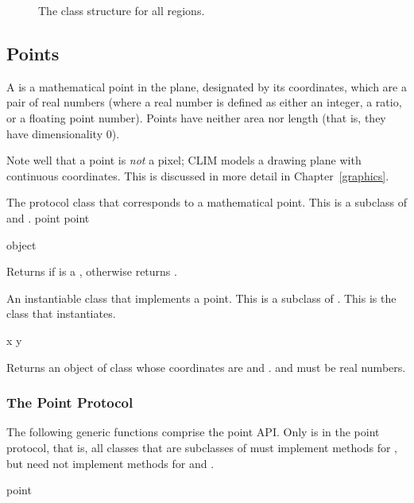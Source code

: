 \begin{figure}
\ifpsfig\centerline{}\else\vspace{2.0in}\fi
\caption{The class structure for all regions.}
\end{figure}


\subsection {Points}

A  is a mathematical point in the plane, designated by its
coordinates, which are a pair of real numbers (where a real number is defined as
either an integer, a ratio, or a floating point number).  Points have neither
area nor length (that is, they have dimensionality 0).

Note well that a point is {\sl not} a pixel; CLIM models a drawing plane with
continuous coordinates.  This is discussed in more detail in
Chapter~\ref{graphics}.


The protocol class that corresponds to a mathematical point.  This is a subclass
of  and .
 {point} {point}

 {object}

Returns  if  is a , otherwise returns
.


An instantiable class that implements a point.  This is a subclass of .
This is the class that  instantiates.  
\Immutable

 {x y}

Returns an object of class  whose coordinates are  and
.   and  must be real numbers.


\subsubsection {The Point Protocol}

The following generic functions comprise the point API.  Only
 is in the point protocol, that is, all classes that are
subclasses of  must implement methods for , but
need not implement methods for  and .

 {point}

